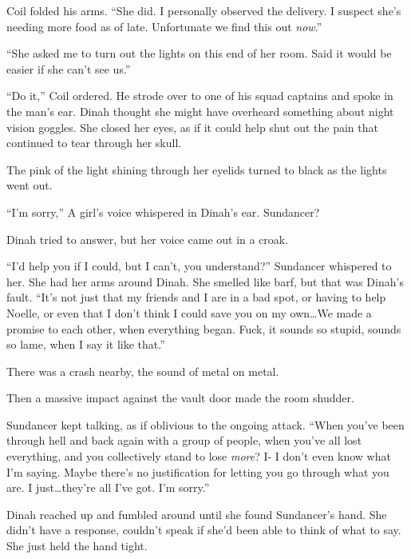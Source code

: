 Coil folded his arms.  ``She did.  I personally observed the delivery.  I suspect she's needing more food as of late.  Unfortunate we find this out \emph{now}.''



``She asked me to turn out the lights on this end of her room.  Said it would be easier if she can't see us.''



``Do it,'' Coil ordered.  He strode over to one of his squad captains and spoke in the man's ear.  Dinah thought she might have overheard something about night vision goggles.  She closed her eyes, as if it could help shut out the pain that continued to tear through her skull.



The pink of the light shining through her eyelids turned to black as the lights went out.



``I'm sorry,'' A girl's voice whispered in Dinah's ear.  Sundancer?



Dinah tried to answer, but her voice came out in a croak.



``I'd help you if I could, but I can't, you understand?'' Sundancer whispered to her.  She had her arms around Dinah.  She smelled like barf, but that was Dinah's fault.  ``It's not just that my friends and I are in a bad spot, or having to help Noelle, or even that I don't think I could save you on my own\ldots  We made a promise to each other, when everything began.  Fuck, it sounds so stupid, sounds so lame, when I say it like that.''



There was a crash nearby, the sound of metal on metal.



Then a massive impact against the vault door made the room shudder.



Sundancer kept talking, as if oblivious to the ongoing attack.  ``When you've been through hell and back again with a group of people, when you've all lost everything, and you collectively stand to lose \emph{more}?  I- I don't even know what I'm saying.  Maybe there's no justification for letting you go through what you are.  I just\ldots they're all I've got.  I'm sorry.''



Dinah reached up and fumbled around until she found Sundancer's hand.  She didn't have a response, couldn't speak if she'd been able to think of what to say.  She just held the hand tight.



